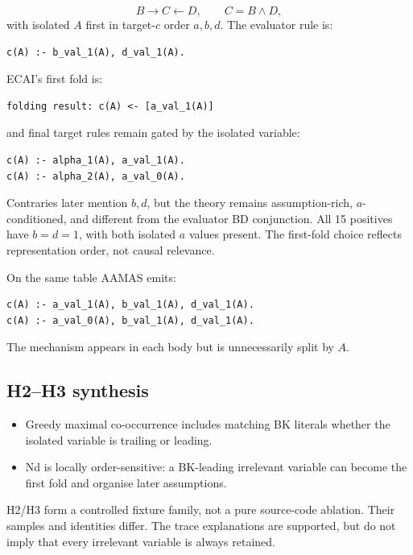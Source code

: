\documentclass[11pt]{article}
\begin{document}
\[
B\longrightarrow C\longleftarrow D,\qquad C=B\land D,
\]
with isolated \(A\) first in target-\(c\) order \(a,b,d\). The evaluator rule
is:

\begin{lstlisting}
c(A) :- b_val_1(A), d_val_1(A).
\end{lstlisting}

ECAI's first fold is:

\begin{lstlisting}
folding result: c(A) <- [a_val_1(A)]
\end{lstlisting}

and final target rules remain gated by the isolated variable:

\begin{lstlisting}
c(A) :- alpha_1(A), a_val_1(A).
c(A) :- alpha_2(A), a_val_0(A).
\end{lstlisting}

Contraries later mention \(b,d\), but the theory remains assumption-rich,
\(a\)-conditioned, and different from the evaluator BD conjunction. All 15
positives have \(b=d=1\), with both isolated \(a\) values present. The
first-fold choice reflects representation order, not causal relevance.

On the same table AAMAS emits:

\begin{lstlisting}
c(A) :- a_val_1(A), b_val_1(A), d_val_1(A).
c(A) :- a_val_0(A), b_val_1(A), d_val_1(A).
\end{lstlisting}

The mechanism appears in each body but is unnecessarily split by \(A\).

\subsection{H2--H3 synthesis}

\begin{itemize}
  \item Greedy maximal co-occurrence includes matching BK literals whether the
  isolated variable is trailing or leading.
  \item Nd is locally order-sensitive: a BK-leading irrelevant variable can
  become the first fold and organise later assumptions.
\end{itemize}

H2/H3 form a controlled fixture family, not a pure source-code ablation. Their
samples and identities differ. The trace explanations are supported, but do
not imply that every irrelevant variable is always retained.
\end{document}
